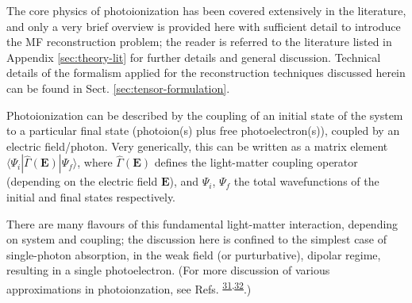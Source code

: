 \documentclass[10pt]{article}
\begin{document}


The core physics of photoionization has been covered extensively in the literature, and only a very brief overview is provided here with sufficient detail to introduce the MF reconstruction problem; the reader is referred to the literature listed in Appendix \ref{sec:theory-lit} for further details and general discussion. Technical details of the formalism applied for the reconstruction techniques discussed herein can be found in Sect. \ref{sec:tensor-formulation}.

Photoionization can be described by the coupling of an initial state of the system to a particular final state (photoion(s) plus free photoelectron(s)), coupled by an electric field/photon. Very generically, this can be written as a matrix element $\langle\Psi_i|\hat{\Gamma}(\boldsymbol{\mathbf{E}})|\Psi_f\rangle$, where $\hat{\Gamma}(\boldsymbol{\mathbf{E}})$ defines the light-matter coupling operator (depending on the electric field $\boldsymbol{\mathbf{E}}$), and $\Psi_i$, $\Psi_f$ the total wavefunctions of the initial and final states respectively. 

There are many flavours of this fundamental light-matter interaction, depending on system and coupling; the discussion here is confined to the simplest case of single-photon absorption, in the weak field (or purturbative), dipolar regime, resulting in a single photoelectron. (For more discussion of various approximations in photoionzation, see Refs. \textsuperscript{\hyperref[csl:31]{31},\hyperref[csl:32]{32}}.)

\end{document}
